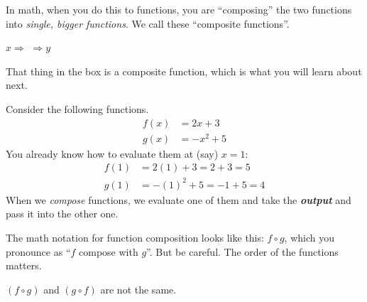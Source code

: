 \documentclass[fleqn,letterpaper,12pt,printwatermark=false]{memoir}
\begin{document}
\begin{myLesson}
    In math, when you do this to functions,
    you are ``composing'' the two functions
    into \emph{single, bigger functions}.
    We call these ``composite functions''.

    \begin{center}
    \vspace{1em}
    \(
        x
        \Longrightarrow
    \)
    \(
        \Longrightarrow
        y
    \)
    \vspace{1em}
    \end{center}
    That thing in the box is a composite function,
    which is what you will learn about next.
\end{myLesson}

\begin{myLesson}[][1]
    Consider the following functions.
    \begin{align*}
        f(x) &= 2x + 3 \\
        g(x) &= -x^2 + 5
    \end{align*}
    You already know how to evaluate them at (say) $x=1$:
    \begin{align*}
        f(1) &= 2(1) + 3   = 2+3    = 5\\
        g(1) &= -(1)^2 + 5 = -1 + 5 = 4
    \end{align*}
    When we \emph{compose} functions, 
    we evaluate one of them and take the {\bfseries\itshape output} and pass it 
    into the other one.

    The math notation for function composition looks like this:
    $f \circ g$,
    which you pronounce as ``$f$ compose with $g$''. 
    But be careful.
    The order of the functions matters.
    \begin{myLessonBox}[3in]
        $(f \circ g)$ 
        and
        $(g \circ f)$ 
        are not the same.
    \end{myLessonBox}
\end{myLesson}
\end{document}
